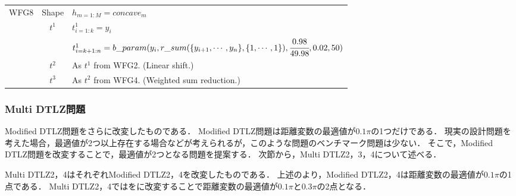 \documentclass[../main/main]{subfiles}
\begin{document}
\begin{table}[htbp]
\begin{tabular}{|c||c|l|}
WFG8 & Shape & $h_{m = 1:M} = concave_m$\\
           &     $ t^1$  & $t^1_{i = 1:k} = y_i$\\
           &                 & $t^1_{i = k+1:n} = b\_param(y_i , r\_sum(\{ y_{i+1}, \cdots, y_n \}, \{1, \cdots, 1\}), \cfrac{0.98}{49.98},0.02,50)$\\
           &     $t^2$   & As $t^1$ from WFG2. (Linear shift.)\\
           &     $t^3$   & As $t^2$ from WFG4. (Weighted sum reduction.)\\
\hline  
\end{tabular}
\end{table}

\subsubsection{Multi DTLZ問題}
Modified DTLZ問題をさらに改変したものである．
Modified DTLZ問題は距離変数の最適値が$0.1\pi$の1つだけである．
現実の設計問題を考えた場合，最適値が2つ以上存在する場合などが考えられるが，このような問題のベンチマーク問題は少ない．
そこで，Modified DTLZ問題を改変することで，最適値が2つとなる問題を提案する．
次節から，Multi DTLZ2，3，4について述べる．

Multi DTLZ2，4はそれぞれModified DTLZ2，4を改変したものである．
上述のより，Modified DTLZ2，4は距離変数の最適値が$0.1\pi$の1点である．
Multi DTLZ2，4ではをに改変することで距離変数の最適値が$0.1\pi$と$0.3\pi$の2点となる．
\end{document}

